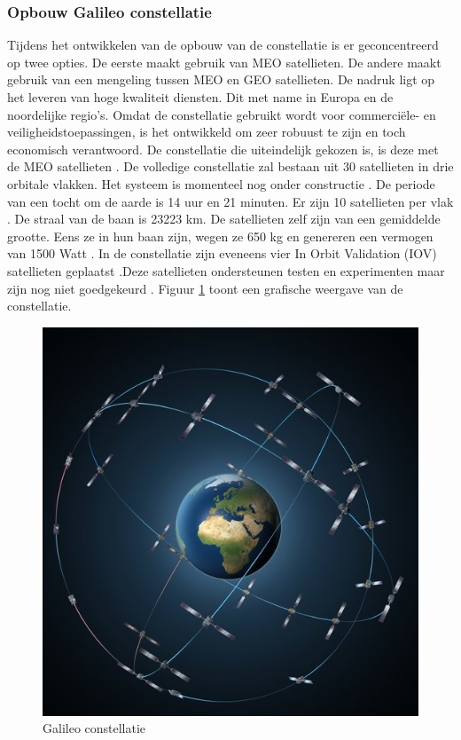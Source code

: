 \subsubsection{Opbouw Galileo constellatie}
Tijdens het ontwikkelen van de opbouw van de constellatie is er geconcentreerd op twee opties. De eerste maakt gebruik van MEO satellieten. De andere maakt gebruik van een mengeling tussen MEO en GEO satellieten. De nadruk ligt op het leveren van hoge kwaliteit diensten. Dit met name in Europa en de noordelijke regio's. Omdat de constellatie gebruikt wordt voor commerci\"ele- en veiligheidstoepassingen, is het ontwikkeld om zeer robuust te zijn en toch economisch verantwoord. De constellatie die uiteindelijk gekozen is, is deze met de MEO satellieten \cite{LBibGalileo2}. De volledige constellatie zal bestaan uit 30 satellieten in drie orbitale vlakken. Het systeem is momenteel nog onder constructie \cite{LBibGNSS4}. De periode van een tocht om de aarde is 14 uur en 21 minuten. Er zijn 10 satellieten per vlak \cite{LBibGNSS6}. De straal van de baan is 23223 km. De satellieten zelf zijn van een gemiddelde grootte. Eens ze in hun baan zijn, wegen ze 650 kg en genereren een vermogen van 1500 Watt \cite{LBibGalileo2}. In de constellatie zijn eveneens vier In Orbit Validation (IOV) satellieten geplaatst \cite{LBibBeiDou3,LBibPPP2}.Deze satellieten ondersteunen testen en experimenten maar zijn nog niet goedgekeurd \cite{LBibGNSS9}. Figuur \ref{imgGalileo} toont een grafische weergave van de constellatie.

\begin{figure}[hpb]
	\includegraphics[scale=1.75]{Galileo.jpg}
	\caption{Galileo constellatie \cite{LImgGalileo}}
	\label{imgGalileo}
\end{figure} 


